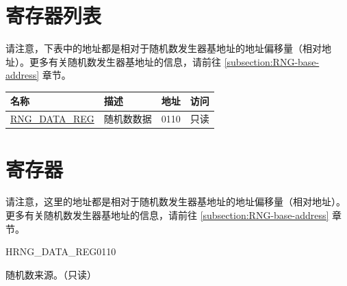 \documentclass[main\_\_CN.tex]{subfiles}
\begin{document}
\hypertarget{rng-reg-summ}{}
\section{寄存器列表}

请注意，下表中的地址都是相对于随机数发生器基地址的地址偏移量（相对地址）。更多有关随机数发生器基地址的信息，请前往 \ref{subsection:RNG-base-address} 章节。
\begin{longtable}{ | p{5cm} | p{3cm} | p{3cm} | p{1cm} | }
\hline
\rowcolor{lightgray}
名称 & 描述 & 地址 & 访问 \\
\hline
\hyperref[regdesc:RNGDATAREG]{RNG\_DATA\_REG} & 随机数数据 & \hexprefix{}0110 & 只读 \\
\hline
\end{longtable}


\section{寄存器}
请注意，这里的地址都是相对于随机数发生器基地址的地址偏移量（相对地址）。更多有关随机数发生器基地址的信息，请前往 \ref{subsection:RNG-base-address} 章节。
\begin{register}{H}{RNG\_DATA\_REG}{\hexprefix{}0110}\label{regdesc:RNGDATAREG}
%
\regnewline%
\begin{regdesc}\begin{reglist}
\item [RNG\_DATA]随机数来源。（只读）
\end{reglist}\end{regdesc}
\end{register}
\end{document}
